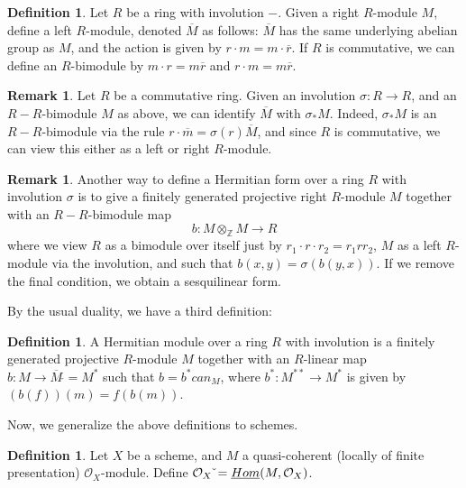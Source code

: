 \documentclass[edeposit,fullpage]{uiucthesis2009}
\newcommand{\Z}{\mathbb Z}
\newcommand{\mc}{\mathcal}
\newcommand{\dual}{\,\check{}}
\theoremstyle{plain}
\numberwithin{lemma}{section}
\theoremstyle{definition}
\newtheorem{definition}[lemma]{Definition}
\newtheorem{remark}[lemma]{Remark}
\begin{document}
\begin{definition}
Let $R$ be a ring with involution $-$. Given a right $R$-module $M$, define
a left $R$-module, denoted $\overline M$ as follows: $\overline M$ has the same underlying abelian
group as $M$, and the action is given by $r \cdot m = m \cdot \overline r$. If $R$ is
commutative, we can define an $R$-bimodule by $m \cdot r =
m \overline r$ and $r \cdot m = m \overline r$. 
\end{definition}

\begin{remark}
Let $R$ be a commutative ring. Given an involution $\sigma : R \rightarrow R$, and an $R-R$-bimodule
$M$ as above, we can identify $\overline M$ with $\sigma_*M$. Indeed,
$\sigma_*M$ is an $R-R$-bimodule via the rule $r \cdot \overline m =
\sigma(r)\overline M$, and since $R$ is commutative, we can view this
either as a left or right $R$-module. 
\end{remark}

\begin{remark}
Another way to define a Hermitian form over a ring $R$ with involution
$\sigma$ is to give a finitely generated projective right $R$-module $M$ together
with an $R-R$-bimodule map  
\[
b :  M \otimes_{\Z}  M \rightarrow R
\]
where we view $R$ as a
bimodule over itself just by $r_1 \cdot r \cdot r_2 = r_1rr_2$, $M$ as
a left $R$-module via the involution, and such that $b(x,y) = \sigma(b(y,x))$. If we remove the final
condition, we obtain a sesquilinear form. 
\end{remark}

By the usual duality, we have a third definition:

\begin{definition}
A
Hermitian module over a ring $R$ with involution is a finitely
generated projective $R$-module $M$ together with an $R$-linear map $b : M
\rightarrow \overline{M}\dual = M^*$ such that $b = b^*can_M$, where
$b^* : M^{**} \rightarrow M^*$ is given by $(b(f))(m) = f(b(m))$.
\end{definition}

Now, we generalize the above definitions to schemes.

\begin{definition}
Let $X$ be a scheme, and $M$ a quasi-coherent (locally of finite presentation) $\mc O_X$-module. Define $\mc O_X\dual
= \uline{Hom}(M,\mc O_X)$.
\end{definition}
\end{document}
